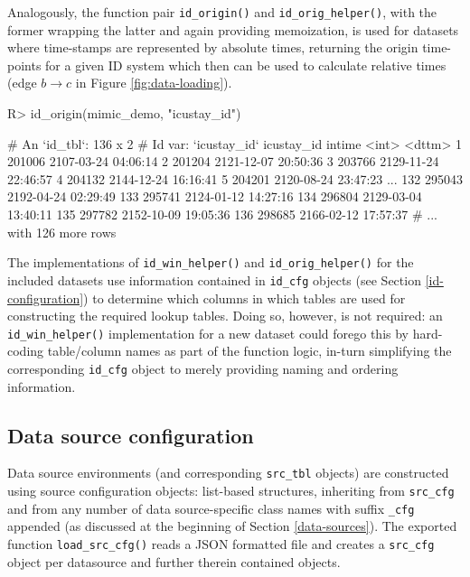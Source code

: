 \documentclass[
  notitle]{jss}
\begin{document}
Analogously, the function pair \texttt{id\_origin()} and
\texttt{id\_orig\_helper()}, with the former wrapping the latter and
again providing memoization, is used for datasets where time-stamps are
represented by absolute times, returning the origin time-points for a
given ID system which then can be used to calculate relative times (edge
\(b \to c\) in Figure \ref{fig:data-loading}).

\begin{CodeChunk}
\begin{CodeInput}
R> id_origin(mimic_demo, "icustay_id")
\end{CodeInput}
\begin{CodeOutput}
# An `id_tbl`: 136 x 2
# Id var:      `icustay_id`
    icustay_id intime
         <int> <dttm>
  1     201006 2107-03-24 04:06:14
  2     201204 2121-12-07 20:50:36
  3     203766 2129-11-24 22:46:57
  4     204132 2144-12-24 16:16:41
  5     204201 2120-08-24 23:47:23
...
132     295043 2192-04-24 02:29:49
133     295741 2124-01-12 14:27:16
134     296804 2129-03-04 13:40:11
135     297782 2152-10-09 19:05:36
136     298685 2166-02-12 17:57:37
# ... with 126 more rows
\end{CodeOutput}
\end{CodeChunk}

The implementations of \texttt{id\_win\_helper()} and
\texttt{id\_orig\_helper()} for the included datasets use information
contained in \texttt{id\_cfg} objects (see Section
\ref{id-configuration}) to determine which columns in which tables are
used for constructing the required lookup tables. Doing so, however, is
not required: an \texttt{id\_win\_helper()} implementation for a new
dataset could forego this by hard-coding table/column names as part of
the function logic, in-turn simplifying the corresponding
\texttt{id\_cfg} object to merely providing naming and ordering
information.

\hypertarget{data-source-configuration}{%
\subsection{Data source configuration}\label{data-source-configuration}}

Data source environments (and corresponding \texttt{src\_tbl} objects)
are constructed using source configuration objects: list-based
structures, inheriting from \texttt{src\_cfg} and from any number of
data source-specific class names with suffix \texttt{\_cfg} appended (as
discussed at the beginning of Section \ref{data-sources}). The exported
function \texttt{load\_src\_cfg()} reads a JSON formatted file and
creates a \texttt{src\_cfg} object per datasource and further therein
contained objects.
\end{document}
